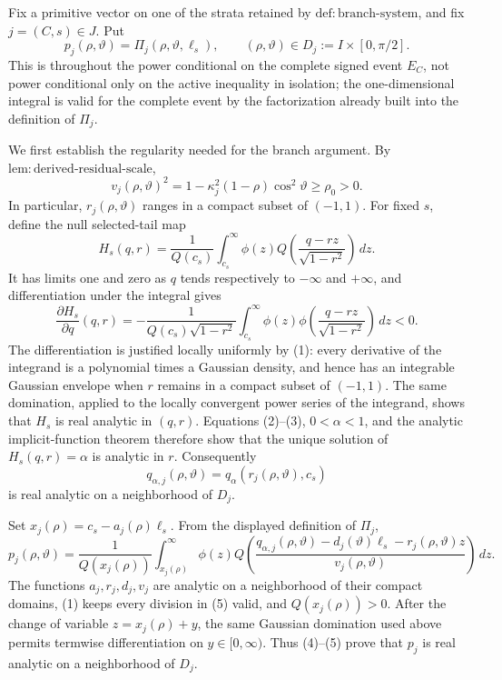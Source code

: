 Fix a primitive vector on one of the strata retained by \(\mathrm{def{:}branch\mbox{-}system}\), and fix \(j=(C,s)\in J\).  Put
\[
p_j(\rho,\vartheta)=\Pi_j(\rho,\vartheta,\ell_s),
\qquad (\rho,\vartheta)\in D_j:=I\times[0,\pi/2].
\]
This is throughout the power conditional on the complete signed event \(E_C\), not power conditional only on the active inequality in isolation; the one-dimensional integral is valid for the complete event by the factorization already built into the definition of \(\Pi_j\).

We first establish the regularity needed for the branch argument.  By \(\mathrm{lem{:}derived\mbox{-}residual\mbox{-}scale}\),
\[
v_j(\rho,\vartheta)^2
=1-\kappa_j^2(1-\rho)\cos^2\vartheta
\geq \rho_0>0.                                                    \tag{1}
\]
In particular, \(r_j(\rho,\vartheta)\) ranges in a compact subset of \((-1,1)\).  For fixed \(s\), define the null selected-tail map
\[
H_s(q,r)
=\frac{1}{Q(c_s)}\int_{c_s}^{\infty}
  \phi(z)Q\!\left(\frac{q-rz}{\sqrt{1-r^2}}\right)\,dz .           \tag{2}
\]
It has limits one and zero as \(q\) tends respectively to \(-\infty\) and \(+\infty\), and differentiation under the integral gives
\[
\frac{\partial H_s}{\partial q}(q,r)
=-\frac{1}{Q(c_s)\sqrt{1-r^2}}
  \int_{c_s}^{\infty}\phi(z)
  \phi\!\left(\frac{q-rz}{\sqrt{1-r^2}}\right)\,dz<0.             \tag{3}
\]
The differentiation is justified locally uniformly by (1): every derivative of the integrand is a polynomial times a Gaussian density, and hence has an integrable Gaussian envelope when \(r\) remains in a compact subset of \((-1,1)\).  The same domination, applied to the locally convergent power series of the integrand, shows that \(H_s\) is real analytic in \((q,r)\).  Equations (2)--(3), \(0<\alpha<1\), and the analytic implicit-function theorem therefore show that the unique solution of \(H_s(q,r)=\alpha\) is analytic in \(r\).  Consequently
\[
q_{\alpha,j}(\rho,\vartheta)
=q_{\alpha}\!\left(r_j(\rho,\vartheta),c_s\right)                \tag{4}
\]
is real analytic on a neighborhood of \(D_j\).

Set \(x_j(\rho)=c_s-a_j(\rho)\ell_s\).  From the displayed definition of \(\Pi_j\),
\[
p_j(\rho,\vartheta)
=\frac{1}{Q(x_j(\rho))}
  \int_{x_j(\rho)}^{\infty}\phi(z)
  Q\!\left(
    \frac{q_{\alpha,j}(\rho,\vartheta)
          -d_j(\vartheta)\ell_s-r_j(\rho,\vartheta)z}
         {v_j(\rho,\vartheta)}
  \right)\,dz .                                                    \tag{5}
\]
The functions \(a_j,r_j,d_j,v_j\) are analytic on a neighborhood of their compact domains, (1) keeps every division in (5) valid, and \(Q(x_j(\rho))>0\).  After the change of variable \(z=x_j(\rho)+y\), the same Gaussian domination used above permits termwise differentiation on \(y\in[0,\infty)\).  Thus (4)--(5) prove that \(p_j\) is real analytic on a neighborhood of \(D_j\).

